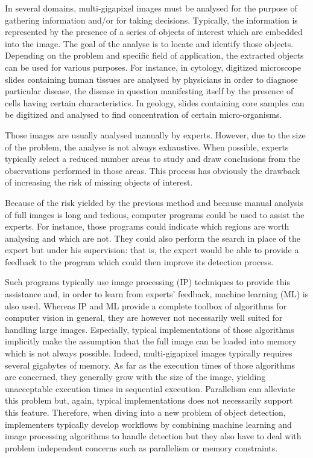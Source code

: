 In several domains, multi-gigapixel images must be analysed for the purpose of gathering information and/or for taking decisions. Typically, the information is represented by the presence of a series of objects of interest which are embedded into the image. The goal of the analyse is to locate and identify those objects. Depending on the problem and  specific field of application, the extracted objects can be used for various purposes. For instance, in cytology, digitized microscope slides containing human tissues are analysed by physicians in order to diagnose particular disease, the disease in question manifesting itself by the presence of cells having certain characteristics. In geology, slides containing core samples can be digitized and analysed to find concentration of certain micro-organisms.

Those images are usually analysed manually by experts. However, due to the size of the problem, the analyse is not always exhaustive. When possible, experts typically select a reduced number areas to study and draw conclusions from the observations performed in those areas. This process has obviously the drawback of increasing the risk of missing objects of interest.

Because of the risk yielded by the previous method and because manual analysis of full images is long and tedious, computer programs could be used to assist the experts. For instance, those programs could indicate which regions are worth analysing and which are not. They could also perform the search in place of the expert but under his supervision: that is, the expert would be able to provide a feedback to the program which could then improve its detection process. 

Such programs typically use image processing (IP) techniques to provide this assistance and, in order to learn from experts' feedback, machine learning (ML) is also used. Whereas IP and ML provide a complete toolbox of algorithms for computer vision in general, they are however not necessarily well suited for handling large images. Especially, typical implementations of those algorithms implicitly make the assumption that the full image can be loaded into memory which is not always possible. Indeed, multi-gigapixel images typically requires several gigabytes of memory. As far as the execution times of those algorithms are concerned, they generally grow with the size of the image, yielding unacceptable execution times in sequential execution. Parallelism can alleviate this problem but, again, typical implementations does not necessarily support this feature. Therefore, when diving into a new problem of object detection, implementers typically develop workflows by combining machine learning and image processing algorithms to handle detection but they also have to deal with problem independent concerns such as parallelism or memory constraints. 

